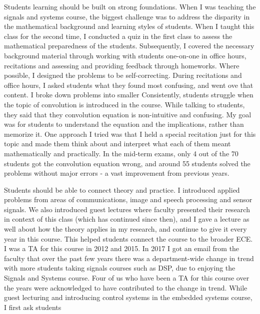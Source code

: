 \documentclass[10pt]{article}
\begin{document}
Students learning should be built on strong foundations. %
When I was teaching the signals and systems course, the biggest challenge was to address the disparity in the mathematical background and learning styles of students. When I taught this class for the second time, I conducted a quiz in the first class to assess the mathematical preparedness of the students. Subsequently, I covered the necessary background material through working with students one-on-one in office hours, recitations and assessing and providing feedback through homeworks. Where possible, I designed the problems to be self-correcting. During recitations and office hours, I asked students what they found most confusing, and went ove that content. I broke down problems into smaller%
Consistently, students struggle when the topic of convolution is introduced in the course. While talking to students, they said that they convolution equation is non-intuitive and confusing. 
My goal was for students to understand the equation and the implications, rather than memorize it. 
One approach I tried was that I held a special recitation just for this topic and 
made them think about and interpret what each of them meant mathematically and practically. In the mid-term exams, only 4 out of the 70 students got the convolution equation wrong, and around 55 students solved the problems without major errors - a vast improvement from previous years. 



Students should be able to connect theory and practice. I introduced applied problems from areas of communications, image and speech processing and sensor signals. We also introduced guest lectures where faculty presented their research in context of this class (which has continued since then), and I gave a lecture as well about how the theory applies in my research, and continue to give it every year in this course. This helped students connect the course to the broader ECE. I was a TA for this course in 2012 and 2015. In 2017 I got an email from the faculty that over the past few years there was a department-wide change in trend with more students taking signals courses such as DSP, due to enjoying the Signals and Systems course.
Four of us who have been a TA for this course over the years were acknowledged to have contributed to the change in trend. While guest lecturing and introducing control systems in the embedded systems course, I first ask students 
\end{document}
